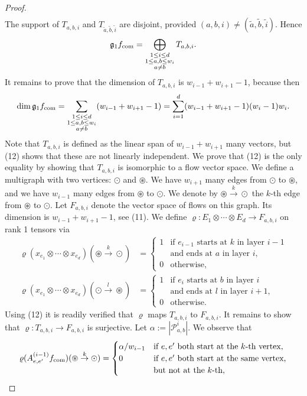 \documentclass[10pt,a4paper]{article}
\newcommand{\fcom}{f_{\rm com}}
\newcommand{\g}{\mathfrak g}
\begin{document}
\begin{proof}
\begin{align*}
\end{align*}
The support of $T_{a,b,i}$ and $T_{\widetilde a,\widetilde b,\widetilde i}$ are disjoint, provided $(a,b,i)\ne(\widetilde a,\widetilde b,\widetilde i)$. Hence
\[\g_1\fcom=\bigoplus_{\substack{1\le i\le d\\1\le a,b\le w_i\\a\ne b}}T_{a,b,i}.\]
It remains to prove that the dimension of $T_{a,b,i}$ is $w_{i-1}+w_{i+1}-1$, because then
\[\dim\g_1\fcom=\sum_{\substack{1\le i\le d\\1\le a,b\le w_i\\a\ne b}}(w_{i-1}+w_{i+1}-1)=\sum_{i=1}^d(w_{i-1}+w_{i+1}-1)(w_i-1)w_i.\]
Note that $T_{a,b,i}$ is defined as the linear span of $w_{i-1}+w_{i+1}$ many vectors, but (12) shows that these are not linearly independent. We prove that (12) is the only equality by showing that $T_{a,b,i}$ is isomorphic to a flow vector space. We define a multigraph with two vertices: $\odot$ and $\circledast$. We have $w_{i+1}$ many edges from $\odot$ to $\circledast$, and we have $w_{i-1}$ many edges from $\circledast$ to $\odot$. We denote by $\circledast\overset k\to\odot$ the $k$-th edge from $\circledast$ to $\odot$. Let $F_{a,b,i}$ denote the vector space of flows on this graph. Its dimension is $w_{i-1}+w_{i+1}-1$, see (11). We define $\varrho:E_1\otimes\cdots\otimes E_d\to F_{a,b,i}$ on rank 1 tensors via
\begin{align*}
\varrho(x_{e_1}\otimes\cdots\otimes x_{e_d})(\circledast\overset k\to\odot)&=\begin{cases}1&\text{if }e_{i-1}\text{ starts at }k\text{ in layer }i-1\\&\text{and ends at }a\text{ in layer }i,\\0&\text{otherwise},\end{cases}\\
\varrho(x_{e_1}\otimes\cdots\otimes x_{e_d})(\odot\overset l\to\circledast)&=\begin{cases}1&\text{if }e_i\text{ starts at }b\text{ in layer }i\\&\text{and ends at }l\text{ in layer }i+1,\\0&\text{otherwise}.\end{cases}
\end{align*}
Using (12) it is readily verified that $\varrho$ maps $T_{a,b,i}$ to $F_{a,b,i}$. It remains to show that $\varrho:T_{a,b,i}\to F_{a,b,i}$ is surjective. Let $\alpha:=|\mathcal P^i_{a,b}|$. We observe that
\begin{align*}
\varrho(A^{(i-1)}_{e,e'}\fcom)(\circledast\overset k\to\odot)&=\begin{cases}\alpha/w_{i-1}&\text{if }e,e'\text{ both start at the }k\text{-th vertex},\\0&\text{if }e,e'\text{ both start at the same vertex,}\\&\text{but not at the }k\text{-th},\end{cases}\\

\end{align*}
\end{proof}
\end{document}
